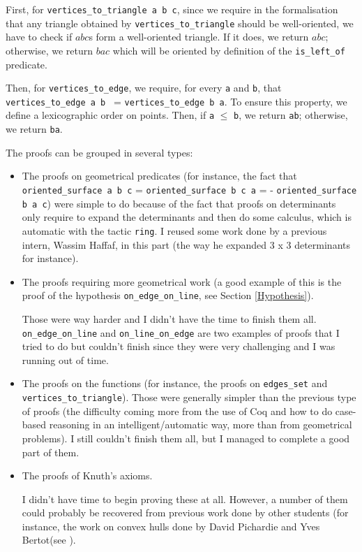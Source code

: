 \documentclass[a4paper,10pt]{article}
\begin{document}
\begin{itemize}
  First, for {\tt vertices\_to\_triangle a b c}, since we require in the formalisation that any triangle obtained by {\tt vertices\_to\_triangle} should be well-oriented, we have to check if $abc$s form a well-oriented triangle. If it does, we return $abc$; otherwise, we return $bac$ which will be oriented by definition of the {\tt is\_left\_of} predicate.

  Then, for {\tt vertices\_to\_edge}, we require, for every {\tt a} and {\tt b}, that {\tt vertices\_to\_edge a b } = {\tt vertices\_to\_edge b a}. To ensure this property, we define a lexicographic order on points. Then, if {\tt a} $\leq$ {\tt b}, we return {\tt ab}; otherwise, we return {\tt ba}.
\end{itemize}
The proofs can be grouped in several types:
\begin{itemize}
\item The proofs on geometrical predicates (for instance, the fact that {\tt oriented\_surface a b c} = {\tt oriented\_surface b c a} = {- \tt oriented\_surface b a c}) were simple to do because of the fact that proofs on determinants only require to expand the determinants and then do some calculus, which is automatic with the tactic {\tt ring}. I reused some work done by a previous intern, Wassim Haffaf, in this part (the way he expanded 3 x 3 determinants for instance).
\item The proofs requiring more geometrical work (a good example of this is the proof of the hypothesis {\tt on\_edge\_on\_line}, see Section \ref{Hypothesis}).

  Those were way harder and I didn't have the time to finish them all. {\tt on\_edge\_on\_line} and {\tt on\_line\_on\_edge} are two examples of proofs that I tried to do but couldn't finish since they were very challenging and I was running out of time.
  \item The proofs on the functions (for instance, the proofs on {\tt edges\_set} and {\tt vertices\_to\_triangle}). Those were generally simpler than the previous type of proofs (the difficulty coming more from the use of {\sc Coq} and how to do case-based reasoning in an intelligent/automatic way, more than from geometrical problems). I still couldn't finish them all, but I managed to complete a good part of them. 

  \item The proofs of Knuth's axioms.

    I didn't have time to begin proving these at all. However, a number of them could probably be recovered from previous work done by other students (for instance, the work on convex hulls done by David Pichardie and Yves Bertot(see \cite{Hull}).
  \end{itemize}
\end{document}
